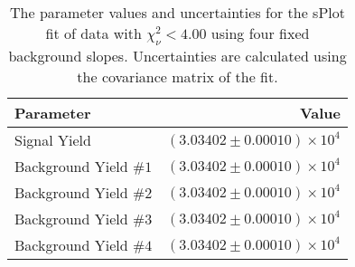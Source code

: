 
\begin{table}[h]
    \begin{center}
        \begin{tabular}{lr}\toprule
            Parameter & Value \\\midrule
            Signal Yield & $(3.03402 \pm 0.00010) \times 10^{4}$ \\
            Background Yield $\#1$ & $(3.03402 \pm 0.00010) \times 10^{4}$ \\
            Background Yield $\#2$ & $(3.03402 \pm 0.00010) \times 10^{4}$ \\
            Background Yield $\#3$ & $(3.03402 \pm 0.00010) \times 10^{4}$ \\
            Background Yield $\#4$ & $(3.03402 \pm 0.00010) \times 10^{4}$ \\\bottomrule
        \end{tabular}
        \caption{The parameter values and uncertainties for the sPlot fit of data with $\chi^2_\nu < 4.00$ using four fixed background slopes. Uncertainties are calculated using the covariance matrix of the fit.}
    \end{center}
\end{table}
